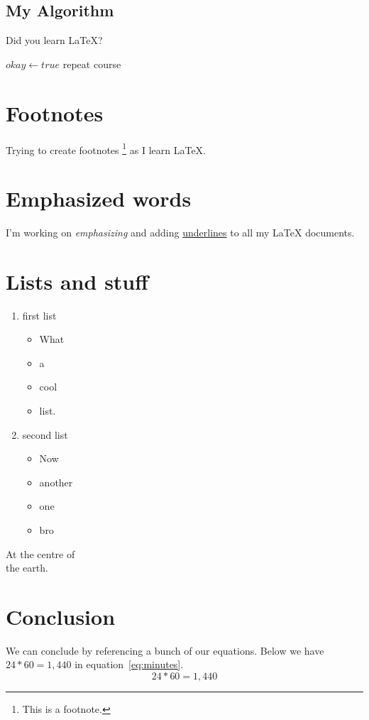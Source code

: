\documentclass{article}
\begin{document}
\subsection{My Algorithm}

Did you learn \LaTeX?

\begin{algorithmic}
	\State $okay \gets true$
\Else
		\State repeat course
	\EndWhile
\EndIf
\end{algorithmic}

\section{Footnotes}
Trying to create footnotes \footnote{This is a footnote.} as I learn \LaTeX.

\section{Emphasized words}
I'm working on \emph{emphasizing} and adding \underline{underlines} to all my \LaTeX{} documents.

\section{Lists and stuff}
\begin{enumerate}
\item first list
\begin{itemize}
\item What 
\item a 
\item cool
\item list.  
\end{itemize}
\item second list
\begin{itemize}
\item Now 
\item another
\item one
\item bro 
\end{itemize}
\end{enumerate}

\begin{center}
At the centre of \\ the earth.
\end{center}


\section{Conclusion}
We can conclude by referencing a bunch of our equations. Below we have $24 * 60 = 1,440$ in equation~\ref{eq:minutes}.
\begin{equation}
24 * 60 = 1,440 
\label{eq:minutes}
\end{equation}
\end{document}
